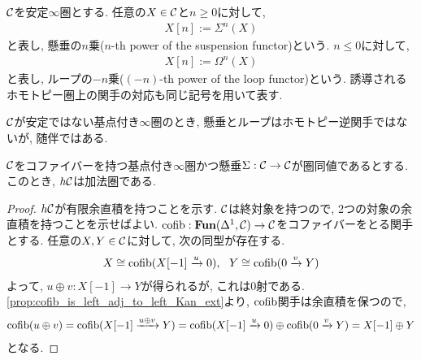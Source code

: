 \documentclass[uplatex, a4paper, 14Q, dvipdfmx]{jsarticle}
\begin{document}
\begin{notation} \label{notation:suspension_and_loop}
  $\mathcal{C}$を安定$\infty$圏とする.
  任意の$X \in \mathcal{C}$と$n \geq 0$に対して, 
  \begin{align*}
    X[n] := \Sigma^n(X)
  \end{align*}
  と表し, 懸垂の$n$乗($n$-th power of the suspension functor)という. 
  $n \leq 0$に対して, 
  \begin{align*}
    X[n] := \Omega^n(X) 
  \end{align*}
  と表し, ループの$-n$乗($(-n)$-th power of the loop functor)という. 
  誘導されるホモトピー圏上の関手の対応も同じ記号を用いて表す.
\end{notation}

\begin{remark}
  $\mathcal{C}$が安定ではない基点付き$\infty$圏のとき, 懸垂とループはホモトピー逆関手ではないが, 随伴ではある.
\end{remark}

\begin{lemma} \label{prop:hc_is_additive}
  $\mathcal{C}$をコファイバーを持つ基点付き$\infty$圏かつ懸垂$\Sigma : \mathcal{C} \to \mathcal{C}$が圏同値であるとする. 
  このとき, $h\mathcal{C}$は加法圏である.
\end{lemma}

\begin{proof}
  $h\mathcal{C}$が有限余直積を持つことを示す. 
  $\mathcal{C}$は終対象を持つので, 2つの対象の余直積を持つことを示せばよい.
  $\mathrm{cofib} : \mathbf{Fun}(\Delta^1,\mathcal{C}) \to \mathcal{C}$をコファイバーをとる関手とする. 
  任意の$X,Y \in \mathcal{C}$に対して, 次の同型が存在する. 
  \begin{align*}
    X \cong \mathrm{cofib}(X[-1] \xrightarrow{u} 0), ~~ Y \cong \mathrm{cofib}(0 \xrightarrow{v} Y)
  \end{align*}
  よって, $u \oplus v :X[-1] \to Y$が得られるが, これは$0$射である. 
  \cref{prop:cofib_is_left_adj_to_left_Kan_ext}より, $\mathrm{cofib}$関手は余直積を保つので, 
  \begin{align*}
    \mathrm{cofib}(u \oplus v) 
    = \mathrm{cofib}(X[-1] \xrightarrow{u \oplus v} Y)
    = \mathrm{cofib}(X[-1] \xrightarrow{u} 0) \oplus \mathrm{cofib}(0 \xrightarrow{v} Y)
    = X[-1] \oplus Y 
  \end{align*}
  となる. 
\end{proof}
\end{document}
